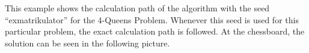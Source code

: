 This example shows the calculation path of the algorithm with the seed \enquote{exmatrikulator} for the 4-Queens Problem. Whenever this seed is used for this particular problem, the exact calculation path is followed. At the chessboard, the solution can be seen in the following picture.

